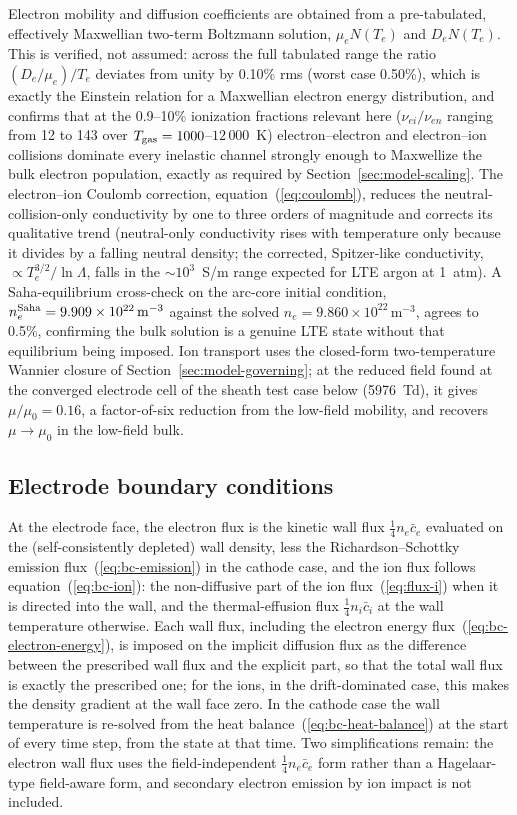 Electron mobility and diffusion coefficients are obtained from a
pre-tabulated, effectively Maxwellian two-term Boltzmann solution,
$\mu_eN(T_e)$ and $D_eN(T_e)$. This is verified, not assumed: across the
full tabulated range the ratio $(D_e/\mu_e)/T_e$ deviates from unity by
0.10\% rms (worst case 0.50\%), which is exactly the Einstein relation for
a Maxwellian electron energy distribution, and confirms that at the
0.9--10\% ionization fractions relevant here ($\nu_{ei}/\nu_{en}$ ranging
from 12 to 143 over $T_{\rm gas}=1000$--$12\,000$~K) electron--electron and
electron--ion collisions dominate every inelastic channel strongly enough
to Maxwellize the bulk electron population, exactly as required by
Section~\ref{sec:model-scaling}. The electron--ion Coulomb correction,
equation~(\ref{eq:coulomb}), reduces the neutral-collision-only
conductivity by one to three orders of magnitude and corrects its
qualitative trend (neutral-only conductivity rises with temperature only
because it divides by a falling neutral density; the corrected, Spitzer-like
conductivity, $\propto T_e^{3/2}/\ln\Lambda$, falls in the $\sim10^3$~S/m
range expected for LTE argon at 1~atm). A Saha-equilibrium cross-check on
the arc-core initial condition, $n_e^{\rm Saha} = 9.909\times10^{22}\,
\mathrm{m^{-3}}$ against the solved $n_e = 9.860\times10^{22}\,
\mathrm{m^{-3}}$, agrees to 0.5\%, confirming the bulk solution is a genuine
LTE state without that equilibrium being imposed. Ion transport uses the
closed-form two-temperature Wannier closure of
Section~\ref{sec:model-governing}; at the reduced field found at the
converged electrode cell of the sheath test case below (5976~Td), it gives
$\mu/\mu_0=0.16$, a factor-of-six reduction from the low-field mobility, and
recovers $\mu\to\mu_0$ in the low-field bulk.

\subsection{Electrode boundary conditions}
\label{sec:methods-bc}

At the electrode face, the electron flux is the kinetic wall flux
$\tfrac14 n_e\bar c_e$ evaluated on the (self-consistently depleted) wall density,
less the Richardson--Schottky emission flux~(\ref{eq:bc-emission}) in the cathode
case, and the ion flux follows equation~(\ref{eq:bc-ion}): the non-diffusive part of
the ion flux~(\ref{eq:flux-i}) when it is directed into the wall, and the
thermal-effusion flux $\tfrac14 n_i\bar c_i$ at the wall temperature otherwise. Each
wall flux, including the electron energy flux~(\ref{eq:bc-electron-energy}), is
imposed on the implicit diffusion flux as the difference between the prescribed wall
flux and the explicit part, so that the total wall flux is exactly the prescribed one;
for the ions, in the drift-dominated case, this makes the density gradient at the wall
face zero. In the cathode case the wall temperature is re-solved from the heat
balance~(\ref{eq:bc-heat-balance}) at the start of every time step, from the state at
that time. Two simplifications remain: the electron wall flux uses the field-independent
$\tfrac14 n_e\bar c_e$ form rather than a Hagelaar-type field-aware form, and
secondary electron emission by ion impact is not included.

